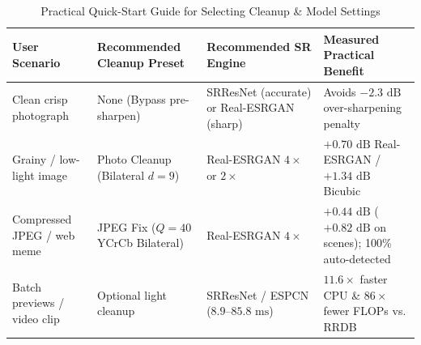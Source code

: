 \documentclass[10pt,onecolumn,journal]{IEEEtran}
\begin{document}
\begin{table}[h]
\centering
\caption{Practical Quick-Start Guide for Selecting Cleanup \& Model Settings}
\label{tab:guide}
\scriptsize
\begin{tabular}{@{}llll@{}}
\toprule
\textbf{User Scenario} & \textbf{Recommended Cleanup Preset} & \textbf{Recommended SR Engine} & \textbf{Measured Practical Benefit} \\
\midrule
Clean crisp photograph & None (Bypass pre-sharpen) & SRResNet (accurate) or Real-ESRGAN (sharp) & Avoids $-2.3\text{ dB}$ over-sharpening penalty \\
Grainy / low-light image & Photo Cleanup (Bilateral $d=9$) & Real-ESRGAN $4\times$ or $2\times$ & $+0.70\text{ dB}$ Real-ESRGAN / $+1.34\text{ dB}$ Bicubic \\
Compressed JPEG / web meme & JPEG Fix ($Q=40$ YCrCb Bilateral) & Real-ESRGAN $4\times$ & $+0.44\text{ dB}$ ($+0.82\text{ dB}$ on scenes); 100\% auto-detected \\
Batch previews / video clip & Optional light cleanup & SRResNet / ESPCN ($8.9$--$85.8\text{ ms}$) & $11.6\times$ faster CPU \& $86\times$ fewer FLOPs vs. RRDB \\
\bottomrule
\end{tabular}
\end{table}
\end{document}

